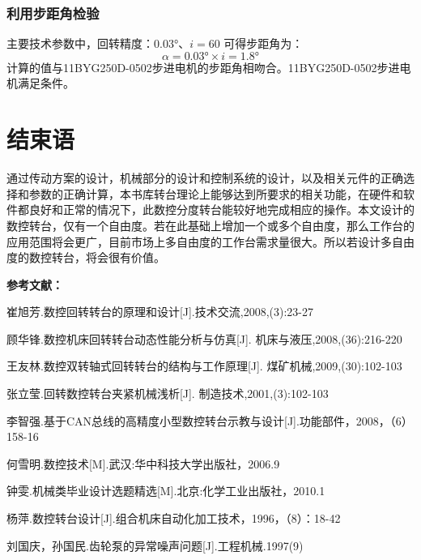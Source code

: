 \documentclass[a4paper,12pt]{article}
\begin{document}
\subsubsection{利用步距角检验}
主要技术参数中，回转精度：$0.03°$、$i=60 $ 可得步距角为： $$\alpha=0.03°\times i=1.8°$$
计算的值与11BYG250D-0502步进电机的步距角相吻合。11BYG250D-0502步进电机满足条件。

\section{结束语}

通过传动方案的设计，机械部分的设计和控制系统的设计，以及相关元件的正确选择和参数的正确计算，本书库转台理论上能够达到所要求的相关功能，在硬件和软件都良好和正常的情况下，此数控分度转台能较好地完成相应的操作。本文设计的数控转台，仅有一个自由度。若在此基础上增加一个或多个自由度，那么工作台的应用范围将会更广，目前市场上多自由度的工作台需求量很大。所以若设计多自由度的数控转台，将会很有价值。

\vspace{4em}

{ \noindent \sanhao \bf 参考文献：}
\begin{enumerate}[{[1]}]
	\item 崔旭芳.数控回转转台的原理和设计[J].技术交流,2008,(3):23-27
	
	\item 顾华锋.数控机床回转转台动态性能分析与仿真[J]. 机床与液压,2008,(36):216-220
	
	\item 王友林.数控双转轴式回转转台的结构与工作原理[J]. 煤矿机械,2009,(30):102-103 
	
	\item 张立莹.回转数控转台夹紧机械浅析[J]. 制造技术,2001,(3):102-103 
	
	\item  李智强.基于CAN总线的高精度小型数控转台示教与设计[J].功能部件，2008，（6）158-16
 
	
	\item 何雪明.数控技术[M].武汉:华中科技大学出版社，2006.9
 
	
	\item  钟雯.机械类毕业设计选题精选[M].北京:化学工业出版社，2010.1 
	
	\item 杨萍.数控转台设计[J].组合机床自动化加工技术，1996，（8）：18-42 
	
	\item 刘国庆，孙国民.齿轮泵的异常噪声问题[J].工程机械.1997(9) 
\end{enumerate}



%
%
%
%
%
%
%
\end{document}

